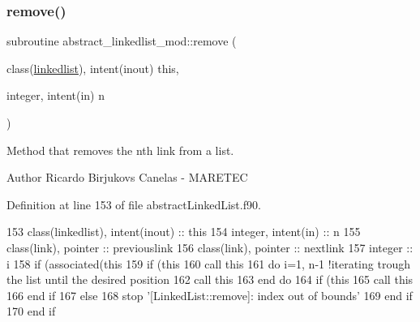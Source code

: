\subsubsection{\texorpdfstring{remove()}{remove()}}
{\footnotesize\ttfamily subroutine abstract\+\_\+linkedlist\+\_\+mod\+::remove (\begin{DoxyParamCaption}\item[{class(\mbox{\hyperlink{structabstract__linkedlist__mod_1_1linkedlist}{linkedlist}}), intent(inout)}]{this,  }\item[{integer, intent(in)}]{n }\end{DoxyParamCaption})\hspace{0.3cm}{\ttfamily [private]}}



Method that removes the nth link from a list. 

\begin{DoxyAuthor}{Author}
Ricardo Birjukovs Canelas -\/ M\+A\+R\+E\+T\+EC 
\end{DoxyAuthor}


Definition at line 153 of file abstract\+Linked\+List.\+f90.


\begin{DoxyCode}
153     \textcolor{keywordtype}{class}(linkedlist), \textcolor{keywordtype}{intent(inout)} :: this
154     \textcolor{keywordtype}{integer}, \textcolor{keywordtype}{intent(in)} :: n
155     \textcolor{keywordtype}{class}(link), \textcolor{keywordtype}{pointer} :: previouslink
156     \textcolor{keywordtype}{class}(link), \textcolor{keywordtype}{pointer} :: nextlink
157     \textcolor{keywordtype}{integer} :: i
158     \textcolor{keywordflow}{if} (\textcolor{keyword}{associated}(this%
159         \textcolor{keywordflow}{if} (this%
160             \textcolor{keyword}{call }this%
161             \textcolor{keywordflow}{do} i=1, n-1    \textcolor{comment}{!iterating trough the list until the desired position}
162                 \textcolor{keyword}{call }this%
163 \textcolor{keywordflow}{            end do}
164             \textcolor{keywordflow}{if} (this%
165                 \textcolor{keyword}{call }this%
166 \textcolor{keywordflow}{            end if}
167         \textcolor{keywordflow}{else}
168             stop \textcolor{stringliteral}{'[LinkedList::remove]: index out of bounds'}
169 \textcolor{keywordflow}{        end if}
170 \textcolor{keywordflow}{    end if}
\end{DoxyCode}
\mbox{\label{namespaceabstract__linkedlist__mod_ae725ed63dd3b08d29e1c4ff824e05589}} 
